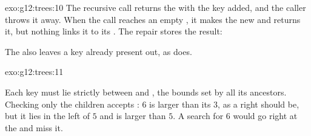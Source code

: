 \begin{solution}{exo:g12:trees:10}
The recursive call returns the  with the key added, and the caller throws it away. When the call reaches an
empty , it makes the new  and returns it, but nothing links it to its . The repair stores the
result:

\smallskip\noindent\hspace*{2em}

\noindent\hspace*{4em}

\noindent\hspace*{2em}

\noindent\hspace*{4em}

\smallskip\noindent The  also leaves a key already present out, as  does.
\end{solution}

\begin{solution}{exo:g12:trees:11}
\smallskip\noindent\hspace*{2em}

\noindent\hspace*{4em}

\noindent\hspace*{6em}

\noindent\hspace*{4em}

\noindent\hspace*{6em}

\noindent\hspace*{4em}

\noindent\hspace*{6em}

\noindent\hspace*{4em}

\smallskip\noindent Each key must lie strictly between  and , the bounds set by all its
ancestors. Checking only the children accepts : $6$ is larger than its
 $3$, as a right  should be, but it lies in the left  of $5$ and is larger than $5$. A search for
$6$ would go right at the  and miss it.
\end{solution}

